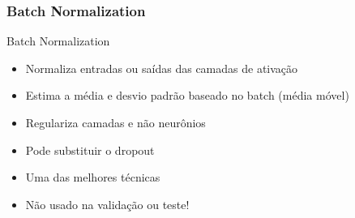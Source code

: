 \documentclass{beamer}
\begin{document}
\begin{frame}
	\frametitle{Batch Normalization}
	\begin{block}{Batch Normalization}
		\begin{itemize}
			\item Normaliza entradas ou saídas das camadas de ativação
			\item Estima a média e desvio padrão baseado no batch (média móvel)
			\item Regulariza camadas e não neurônios
			\item Pode substituir o dropout
			\item Uma das melhores técnicas
			\item Não usado na validação ou teste!
		\end{itemize}
	\end{block}
\end{frame}	
\end{document}
